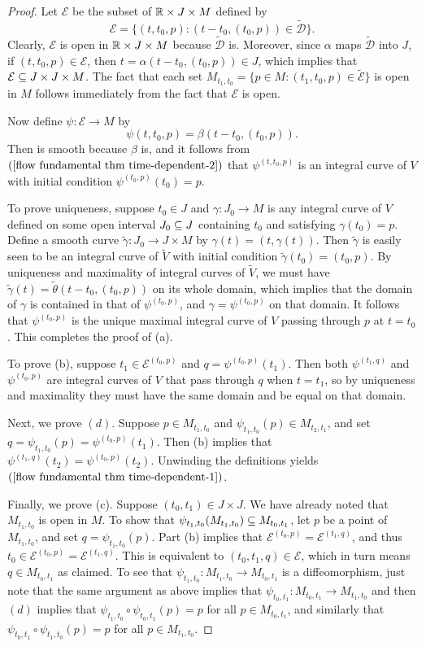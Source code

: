 \begin{proof}
Let $\mathcal{E}$ be the subset of $\mathbb{R}\times J\times M$ defined by
\[\mathcal{E}=\{(t,t_0,p):(t-t_0,(t_0,p))\in\widetilde{\mathcal{D}}\}.\]
Clearly, $\mathcal{E}$ is open in $\mathbb{R}\times J\times M$ because $\widetilde{\mathcal{D}}$ is. Moreover, since $\alpha$ maps $\widetilde{\mathcal{D}}$ into $J$, if $(t,t_0,p)\in\mathcal{E}$, then $t=\alpha(t-t_0,(t_0,p))\in J$, which implies that $\mathcal{E}\subseteq J\times J\times M$. The fact that each set $M_{t_1,t_0}=\{p\in M:(t_1,t_0,p)\in\widetilde{\mathcal{E}}\}$ is open in $M$ follows immediately from the fact that $\mathcal{E}$ is open.\par
Now define $\psi:\mathcal{E}\to M$ by
\[\psi(t,t_0,p)=\beta(t-t_0,(t_0,p)).\]
Then is smooth because $\beta$ is, and it follows from $(\ref{flow fundamental thm time-dependent-2})$ that $\psi^{(t,t_0,p)}$ is an integral curve of $V$ with initial condition $\psi^{(t_0,p)}(t_0)=p$.\par
To prove uniqueness, suppose $t_0\in J$ and $\gamma:J_0\to M$ is any integral curve of $V$ defined on some open interval $J_0\subseteq J$ containing $t_0$ and satisfying $\gamma(t_0)=p$. Define a smooth curve $\widetilde{\gamma}:J_0\to J\times M$ by $\gamma(t)=(t,\gamma(t))$. Then $\widetilde{\gamma}$ is easily seen to be an integral curve of $\widetilde{V}$ with initial condition $\widetilde{\gamma}(t_0)=(t_0,p)$. By uniqueness and maximality of integral curves of $\widetilde{V}$, we must have $\widetilde{\gamma}(t)=\widetilde{\theta}(t-t_0,(t_0,p))$ on its whole domain, which implies that the domain of $\gamma$ is contained in that of $\psi^{(t_0,p)}$, and $\gamma=\psi^{(t_0,p)}$ on that domain. It follows that $\psi^{(t_0,p)}$ is the unique maximal integral curve of $V$ passing through $p$ at $t =t_0$. This completes the proof of (a).\par
To prove (b), suppose $t_1\in\mathcal{E}^{(t_0,p)}$ and $q=\psi^{(t_0,p)}(t_1)$. Then both $\psi^{(t_1,q)}$ and $\psi^{(t_0,p)}$ are integral curves of $V$ that pass through $q$ when $t=t_1$, so by uniqueness and maximality they must have the same domain and be equal on that domain.\par
Next, we prove $(d)$. Suppose $p\in M_{t_1,t_0}$ and $\psi_{t_1,t_0}(p)\in M_{t_2,t_1}$, and set $q=\psi_{t_1,t_0}(p)=\psi^{(t_0,p)}(t_1)$. Then (b) implies that $\psi^{(t_1,q)}(t_2)=\psi^{(t_0,p)}(t_2)$. Unwinding the definitions yields $(\ref{flow fundamental thm time-dependent-1})$.\par
Finally, we prove (c). Suppose $(t_0,t_1)\in J\times J$. We have already noted that $M_{t_1,t_0}$ is open in $M$. To show that $\psi_{t_1,t_0}(M_{t_1,t_0})\subseteq M_{t_0,t_1}$, let $p$ be a point of $M_{t_1,t_0}$, and set $q=\psi_{t_1,t_0}(p)$. Part (b) implies that $\mathcal{E}^{(t_0,p)}=\mathcal{E}^{(t_1,q)}$, and thus $t_0\in\mathcal{E}^{(t_0,p)}=\mathcal{E}^{(t_1,q)}$. This is equivalent to $(t_0,t_1,q)\in\mathcal{E}$, which in turn means $q\in M_{t_0,t_1}$ as claimed. To see that $\psi_{t_1,t_0}:M_{t_1,t_0}\to M_{t_0,t_1}$ is a diffeomorphism, just note that the same argument as above implies that $\psi_{t_0,t_1}:M_{t_0,t_1}\to M_{t_1,t_0}$ and then $(d)$ implies that $\psi_{t_1,t_0}\circ\psi_{t_0,t_1}(p)=p$ for all $p\in M_{t_0,t_1}$, and similarly that $\psi_{t_0,t_1}\circ\psi_{t_1,t_0}(p)=p$ for all $p\in M_{t_1,t_0}$.

\end{proof}
